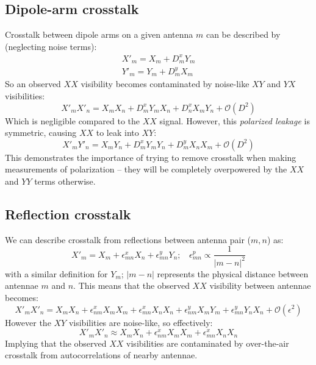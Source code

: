 \documentclass[10pt,a4paper,notitlepage]{article}
\begin{document}
\subsection{Dipole-arm crosstalk}
\label{subsec:theory_dterms}
Crosstalk between dipole arms on a given antenna $m$ can be described by (neglecting noise terms):
\begin{align*}
X'_m = X_m + D^x_mY_m\\
Y'_m = Y_m + D^y_mX_m
\end{align*}
\noindent So an observed $XX$ visibility becomes contaminated by noise-like $XY$ and $YX$ visibilities:
\begin{equation}
X'_mX'_n = X_mX_n + D^x_mY_mX_n + D^x_nX_mY_n  + \mathcal{O}(D^2)
\label{eq:XX_leakage}
\end{equation}
\noindent Which is negligible compared to the $XX$ signal. However, this \textit{polarized leakage} is symmetric, causing $XX$ to leak into $XY$:
\begin{equation}
X'_mY'_n=X_mY_n + D^x_mY_mY_n + D^y_mX_nX_m + \mathcal{O}(D^2)
\end{equation}
\noindent This demonstrates the importance of trying to remove crosstalk when making measurements of polarization -- they will be completely overpowered by the $XX$ and $YY$ terms otherwise.

\subsection{Reflection crosstalk}
\label{subsec:theory_reflection}
We can describe crosstalk from reflections between antenna pair ($m,n$) as:
\begin{equation}
X'_m = X_m + \epsilon^x_{mn}X_n + \epsilon^y_{mn}Y_n;~~~~\epsilon^p_{mn}\propto\frac{1}{|m-n|^2}
\end{equation}
\noindent with a similar definition for $Y_m$; $|m-n|$ represents the physical distance between antennae $m$ and $n$. This means that the observed $XX$ visibility between antennae becomes:
\begin{equation}
X'_mX'_n = X_mX_n + \epsilon^x_{nm}X_mX_m + \epsilon^x_{mn}X_nX_n + \epsilon^y_{nm}X_mY_m + \epsilon^y_{mn}Y_nX_n + \mathcal{O}(\epsilon^2)
\label{eq:XX_reflection}
\end{equation}
\noindent However the $XY$ visibilities are noise-like, so effectively:
\begin{equation}
X'_mX'_n \approx X_mX_n + \epsilon^x_{nm}X_mX_m + \epsilon^x_{mn}X_nX_n 
\end{equation}
\noindent Implying that the observed $XX$ visibilities are contaminated by over-the-air crosstalk from autocorrelations of nearby antennae.
\end{document}
